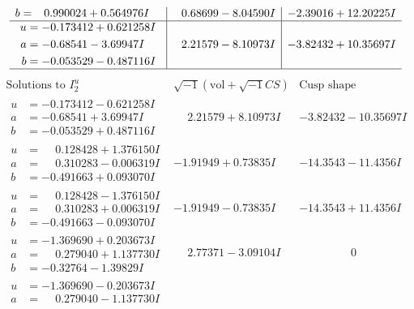 \documentclass[1p]{elsarticle_modified}
\theoremstyle{definition}
\newcommand{\I}{\sqrt{-1}}
\begin{document}
$$\begin{array}{c|c|c}
\begin{aligned}
b &= \phantom{-}0.990024 + 0.564976 I\end{aligned}
 & \phantom{-}0.68699 - 8.04590 I & -2.39016 + 12.20225 I \\ \hline\begin{aligned}
u &= -0.173412 + 0.621258 I \\
a &= -0.68541 - 3.69947 I \\
b &= -0.053529 - 0.487116 I\end{aligned}
 & \phantom{-}2.21579 - 8.10973 I & -3.82432 + 10.35697 I\\
 \hline 
 \end{array}$$\newpage$$\begin{array}{c|c|c}  
\text{Solutions to }I^u_{2}& \I (\text{vol} + \sqrt{-1}CS) & \text{Cusp shape}\\
 \hline 
\begin{aligned}
u &= -0.173412 - 0.621258 I \\
a &= -0.68541 + 3.69947 I \\
b &= -0.053529 + 0.487116 I\end{aligned}
 & \phantom{-}2.21579 + 8.10973 I & -3.82432 - 10.35697 I \\ \hline\begin{aligned}
u &= \phantom{-}0.128428 + 1.376150 I \\
a &= \phantom{-}0.310283 - 0.006319 I \\
b &= -0.491663 + 0.093070 I\end{aligned}
 & -1.91949 + 0.73835 I & -14.3543 - 11.4356 I \\ \hline\begin{aligned}
u &= \phantom{-}0.128428 - 1.376150 I \\
a &= \phantom{-}0.310283 + 0.006319 I \\
b &= -0.491663 - 0.093070 I\end{aligned}
 & -1.91949 - 0.73835 I & -14.3543 + 11.4356 I \\ \hline\begin{aligned}
u &= -1.369690 + 0.203673 I \\
a &= \phantom{-}0.279040 + 1.137730 I \\
b &= -0.32764 - 1.39829 I\end{aligned}
 & \phantom{-}2.77371 - 3.09104 I & \phantom{-0.000000 } 0 \\ \hline\begin{aligned}
u &= -1.369690 - 0.203673 I \\
a &= \phantom{-}0.279040 - 1.137730 I \\

\end{aligned}
\end{array}$$
\end{document}
